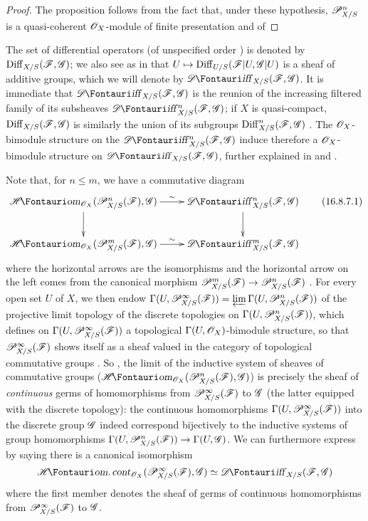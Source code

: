 \begin{proof}
The proposition follows from the fact that, under these hypothesis, $\mathscr{P}_{X/S}^n$ is a quasi-coherent $\mathscr{O}_X$-module of finite presentation  and of 
\end{proof}

\begin{env}[16.8.6]
\label{IV.16.8.6}
The set of differential operators (of unspecified order ) is denoted by $\operatorname{Diff}_{X/S}(\mathscr{F}, \mathscr{G})$;
we also see as in  that $U \mapsto \Diff_{U/S}(\sh{F}|U, \sh{G}|U)$ is a sheaf of additive groups, which we will denote by $\shDiff_{X/S}(\sh{F}, \sh{G})$.
It is immediate that $\shDiff_{X/S}(\sh{F}, \sh{G})$ is the reunion of the increasing filtered family of its subsheaves $\shDiff_{X/S}^n(\sh{F}, \sh{G})$;
if $X$ is quasi-compact, $\operatorname{Diff}_{X/S}(\mathscr{F}, \mathscr{G})$ 
is similarly the union of its subgroups $\operatorname{Diff}_{X/S}^n(\mathscr{F}, \mathscr{G})$ .
The $\mathscr{O}_X$-bimodule structure on the $\shDiff_{X/S}^n(\sh{F}, \sh{G})$ induce therefore a $\mathscr{O}_X$-bimodule structure on $\shDiff_{X/S}(\sh{F}, \sh{G})$, further explained in  and .

Note that, for $n \leq m$, we have a commutative diagram
\[
  \label{IV.16.8.7.1}
  \xymatrix{
    \shHom_{\sh{O}_X}(\sh{P}_{X/S}^n(\sh{F}), \sh{G}) \ar[r]^-{\sim} \ar[d] & \shDiff_{X/S}^n(\sh{F}, \sh{G}) \ar[d] \\
    \shHom_{\sh{O}_X}(\sh{P}_{X/S}^m(\sh{F}), \sh{G}) \ar[r]^-{\sim} & \shDiff_{X/S}^m(\sh{F}, \sh{G})
  }
  \tag{16.8.7.1}
\] 
where the horizontal arrows are the isomorphisms  and the horizontal arrow on the left comes from the canonical morphism $\sh{P}_{X/S}^m(\sh{F}) \to \sh{P}_{X/S}^n(\sh{F})$ .
For every open set $U$ of $X$, we then endow $\Gamma(U, \mathscr{P}_{X/S}^\infty(\mathscr{F})) = \varprojlim \Gamma(U, \mathscr{P}_{X/S}^n(\mathscr{F}))$ of the projective limit topology of the discrete topologies on $\Gamma(U, \mathscr{P}_{X/S}^n(\mathscr{F}))$, which defines on $\Gamma(U, \mathscr{P}_{X/S}^\infty(\mathscr{F}))$ a topological $\Gamma(U, \mathscr{O}_X)$-bimodule structure, so that $\mathscr{P}_{X/S}^\infty(\mathscr{F})$ shows itself as a sheaf valued in the category of topological commutative groups .
So \cite[II, 1.11]{I-4}, the limit of the inductive system of sheaves of commutative groups ($\shHom_{\sh{O}_X}(\sh{P}_{X/S}^n(\sh{F}), \sh{G})$) is precisely the sheaf of \emph{continuous} germs of homomorphisms from $\mathscr{P}_{X/S}^\infty(\mathscr{F})$ to $\mathscr{G}$ (the latter equipped with the discrete topology):
the continuous homomorphisms $\Gamma(U, \mathscr{P}_{X/S}^\infty(\mathscr{F}))$ into the discrete group $\mathscr{G}$ indeed correspond bijectively to the inductive systems of group homomorphisms $\Gamma(U, \sh{P}_{X/S}^n(\sh{F})) \to \Gamma(U, \sh{G})$.
We can furthermore express  by saying there is a canonical isomorphism
\[
  \shHomcont_{\sh{O}_X} (\sh{P}_{X/S}^\infty(\sh{F}), \sh{G}) \isoto \shDiff_{X/S}(\sh{F}, \sh{G})
\]
where the first member denotes the sheaf of germs of continuous homomorphisms from $\mathscr{P}_{X/S}^\infty(\mathscr{F})$ to $\mathscr{G}$.
\end{env}

